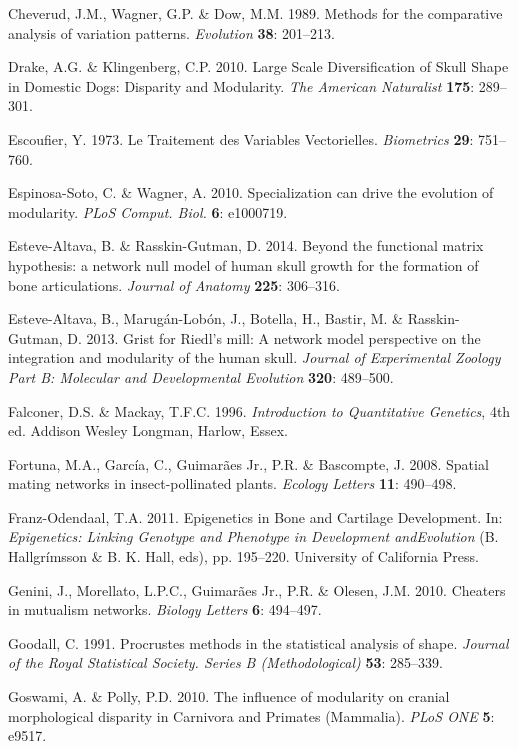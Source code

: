 \documentclass[12pt,]{article}
\begin{document}
Cheverud, J.M., Wagner, G.P. \& Dow, M.M. 1989. Methods for the
comparative analysis of variation patterns. \emph{Evolution}
\textbf{38}: 201--213.

Drake, A.G. \& Klingenberg, C.P. 2010. Large Scale Diversification of
Skull Shape in Domestic Dogs: Disparity and Modularity. \emph{The
American Naturalist} \textbf{175}: 289--301.

Escoufier, Y. 1973. Le Traitement des Variables Vectorielles.
\emph{Biometrics} \textbf{29}: 751--760.

Espinosa-Soto, C. \& Wagner, A. 2010. Specialization can drive the
evolution of modularity. \emph{PLoS Comput. Biol.} \textbf{6}: e1000719.

Esteve-Altava, B. \& Rasskin-Gutman, D. 2014. Beyond the functional
matrix hypothesis: a network null model of human skull growth for the
formation of bone articulations. \emph{Journal of Anatomy} \textbf{225}:
306--316.

Esteve-Altava, B., Marugán-Lobón, J., Botella, H., Bastir, M. \&
Rasskin-Gutman, D. 2013. Grist for Riedl's mill: A network model
perspective on the integration and modularity of the human skull.
\emph{Journal of Experimental Zoology Part B: Molecular and
Developmental Evolution} \textbf{320}: 489--500.

Falconer, D.S. \& Mackay, T.F.C. 1996. \emph{Introduction to
Quantitative Genetics}, 4th ed. Addison Wesley Longman, Harlow, Essex.

Fortuna, M.A., García, C., Guimarães Jr., P.R. \& Bascompte, J. 2008.
Spatial mating networks in insect-pollinated plants. \emph{Ecology
Letters} \textbf{11}: 490--498.

Franz-Odendaal, T.A. 2011. Epigenetics in Bone and Cartilage
Development. In: \emph{Epigenetics: Linking Genotype and Phenotype in
Development andEvolution} (B. Hallgrímsson \& B. K. Hall, eds), pp.
195--220. University of California Press.

Genini, J., Morellato, L.P.C., Guimarães Jr., P.R. \& Olesen, J.M. 2010.
Cheaters in mutualism networks. \emph{Biology Letters} \textbf{6}:
494--497.

Goodall, C. 1991. Procrustes methods in the statistical analysis of
shape. \emph{Journal of the Royal Statistical Society. Series B
(Methodological)} \textbf{53}: 285--339.

Goswami, A. \& Polly, P.D. 2010. The influence of modularity on cranial
morphological disparity in Carnivora and Primates (Mammalia). \emph{PLoS
ONE} \textbf{5}: e9517.
\end{document}
